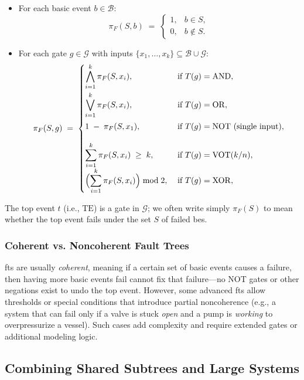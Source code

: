 \begin{itemize}
\item For each basic event \(b \in \mathcal{B}\):
  \[
    \pi_F(S, b) \;=\;
    \begin{cases}
      1, & b \in S,\\
      0, & b \notin S.
    \end{cases}
  \]
\item For each gate \(g \in \mathcal{G}\) with inputs \(\{x_1,\dots,x_k\}\subseteq \mathcal{B}\cup\mathcal{G}\):
  \[
  \pi_F(S,g) 
  \;=\;
  \begin{cases}
  \displaystyle
    \bigwedge_{i=1}^k \pi_F(S, x_i),
    & \;\text{if }T(g)=\mathrm{AND},\\[1.2em]
  \displaystyle
    \bigvee_{i=1}^k \pi_F(S, x_i),
    & \;\text{if }T(g)=\mathrm{OR},\\[1.2em]
  \displaystyle
    1 \;-\; \pi_F(S, x_1),
    & \;\text{if }T(g)=\mathrm{NOT} \text{ (single input)},\\[1.2em]
  \displaystyle
    \sum_{i=1}^k \pi_F(S,x_i)\;\ge\;k,
    & \;\text{if }T(g)=\mathrm{VOT}(k/n),\\
  \displaystyle
    \Bigl(\sum_{i=1}^k \pi_F(S,x_i)\Bigr)\bmod 2,
    & \;\text{if }T(g)=\mathrm{XOR} ,\\[0.6em]
  \end{cases}
  \]
\end{itemize}
The top event \(t\) (i.e., \(\mathrm{TE}\)) is a gate in \(\mathcal{G}\); we often write simply \(\pi_F(S)\) to mean whether the top event fails under the set \(S\) of failed \acrshort{be}s.

\subsubsection{Coherent vs. Noncoherent Fault Trees}
\acrshort{ft}s are usually \emph{coherent}, meaning if a certain set of basic events causes a failure, then having more basic events fail cannot fix that failure—no NOT gates or other negations exist to undo the top event. However, some advanced \acrshort{ft}s allow thresholds or special conditions that introduce partial noncoherence (e.g., a system that can fail only if a valve is stuck \emph{open} and a pump is \emph{working} to overpressurize a vessel). Such cases add complexity and require extended gates or additional modeling logic.

\subsection{Combining Shared Subtrees and Large Systems}

